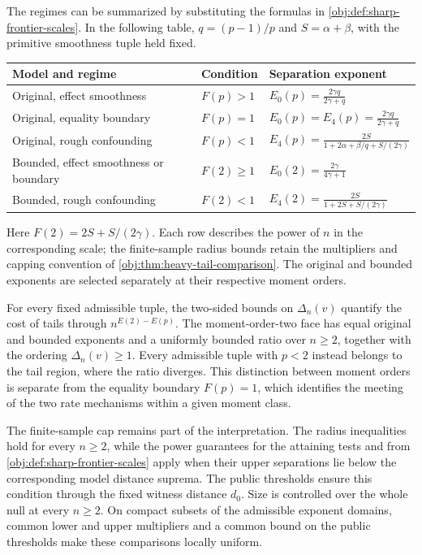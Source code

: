 The regimes can be summarized by substituting the formulas in \cref{obj:def:sharp-frontier-scales}. In the following table, \(q=(p-1)/p\) and \(S=\alpha+\beta\), with the primitive smoothness tuple held fixed.
\begin{center}
\begin{tabular}{lll}
\hline
Model and regime & Condition & Separation exponent \\
\hline
Original, effect smoothness
& \(F(p)>1\)
& \(\displaystyle E_0(p)=\frac{2\gamma q}{2\gamma+q}\) \\[6pt]
Original, equality boundary
& \(F(p)=1\)
& \(\displaystyle E_0(p)=E_4(p)=\frac{2\gamma q}{2\gamma+q}\) \\[6pt]
Original, rough confounding
& \(F(p)<1\)
& \(\displaystyle E_4(p)=\frac{2S}{1+2\alpha+\beta/q+S/(2\gamma)}\) \\[6pt]
Bounded, effect smoothness or boundary
& \(F(2)\ge1\)
& \(\displaystyle E_0(2)=\frac{2\gamma}{4\gamma+1}\) \\[6pt]
Bounded, rough confounding
& \(F(2)<1\)
& \(\displaystyle E_4(2)=\frac{2S}{1+2S+S/(2\gamma)}\) \\[6pt]
\hline
\end{tabular}
\end{center}
Here \(F(2)=2S+S/(2\gamma)\). Each row describes the power of \(n\) in the corresponding scale; the finite-sample radius bounds retain the multipliers and capping convention of \cref{obj:thm:heavy-tail-comparison}. The original and bounded exponents are selected separately at their respective moment orders.

For every fixed admissible tuple, the two-sided bounds on \(\Delta_n(v)\) quantify the cost of tails through \(n^{E(2)-E(p)}\). The moment-order-two face has equal original and bounded exponents and a uniformly bounded ratio over \(n\ge2\), together with the ordering \(\Delta_n(v)\ge1\). Every admissible tuple with \(p<2\) instead belongs to the tail region, where the ratio diverges. This distinction between moment orders is separate from the equality boundary \(F(p)=1\), which identifies the meeting of the two rate mechanisms within a given moment class.

The finite-sample cap remains part of the interpretation. The radius inequalities hold for every \(n\ge2\), while the power guarantees for the attaining tests  and  from \cref{obj:def:sharp-frontier-scales} apply when their upper separations lie below the corresponding model distance suprema. The public thresholds ensure this condition through the fixed witness distance \(d_0\). Size is controlled over the whole null at every \(n\ge2\). On compact subsets of the admissible exponent domains, common lower and upper multipliers and a common bound on the public thresholds make these comparisons locally uniform.

